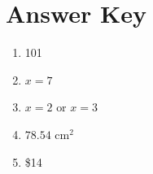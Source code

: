 \documentclass{article}
\begin{document}
\section*{Answer Key}

\begin{enumerate}
    \item 101
    \item \( x = 7 \)
    \item \( x = 2 \text{ or } x = 3 \)
    \item \( 78.54 \text{ cm}^2 \)
    \item \$14
\end{enumerate}
\end{document}
